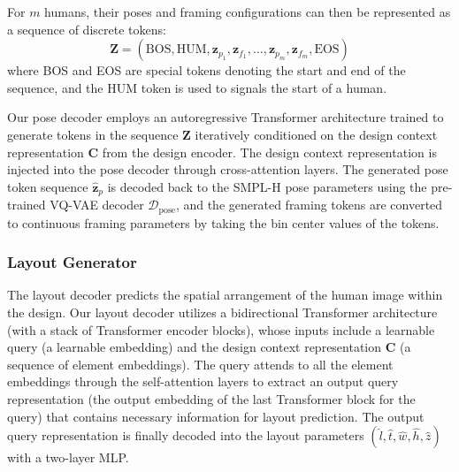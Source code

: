 For $m$ humans, their poses and framing configurations can then be represented as a sequence of discrete tokens:
\begin{equation}
    \mathbf{Z} = (\text{BOS}, \text{HUM}, \mathbf{z}_{p_1}, \mathbf{z}_{f_1}, \ldots, \mathbf{z}_{p_m}, \mathbf{z}_{f_m}, \text{EOS})
\end{equation}
where BOS and EOS are special tokens denoting the start and end of the sequence, and the HUM token is used to signals the start of a human.

Our pose decoder employs an
autoregressive Transformer architecture trained to generate tokens in the sequence $\mathbf{Z}$ iteratively conditioned on the design context representation $\mathbf{C}$ from the design encoder. 
The design context representation is injected into the pose decoder through cross-attention layers. 
The generated pose token sequence $\hat{\mathbf{z}}_p$ is decoded back to the SMPL-H pose parameters using the pre-trained VQ-VAE decoder $\mathcal{D}_\text{pose}$, and the generated framing tokens are converted to continuous framing parameters by taking the bin center values of the tokens.
 

\subsubsection{Layout Generator}

The layout decoder predicts the spatial arrangement of the human image within the design. Our layout decoder utilizes a bidirectional Transformer architecture (with a stack of Transformer encoder blocks), whose inputs include a learnable query (a learnable embedding) and the design context representation $\mathbf{C}$ (a sequence of element embeddings). The query attends to all the element embeddings through the self-attention layers to extract an output query representation (the output embedding of the last Transformer block for the query) that contains necessary information for layout prediction. The output query representation is finally decoded into the layout parameters $(\hat{l}, \hat{t}, \hat{w}, \hat{h}, \hat{z})$ with a  two-layer MLP.

